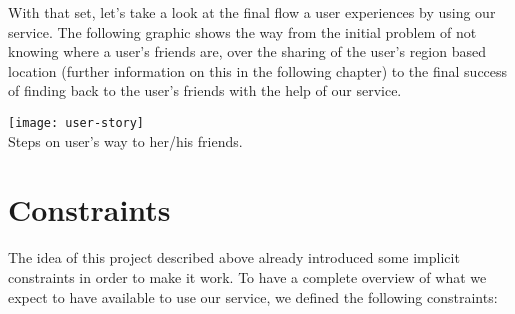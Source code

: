 With that set, let's take a look at the final flow a user experiences by using our service. The following graphic shows the way from the initial problem of not knowing where a user's friends are, over the sharing of the user's region based location (further information on this in the following chapter) to the final success of finding back to the user's friends with the help of our service.

\begin{center}
    \texttt{[image: user-story]}\\
    Steps on user's way to her/his friends.
\end{center}


\section{Constraints}

The idea of this project described above already introduced some implicit constraints in order to make it work. To have a complete overview of what we expect to have available to use our service, we defined the following constraints:

